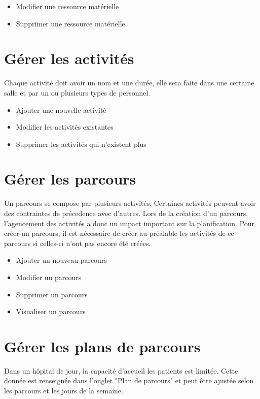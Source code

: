 \documentclass[noposter]{polytech/polytech}
\begin{document}
\begin{itemize}
	\item Modifier une ressource matérielle
	\item Supprimer une ressource matérielle 
\end{itemize}


\section{Gérer les activités}

Chaque activité doit avoir un nom et une durée, elle sera faite dans une certaine salle et par un ou plusieurs types de personnel.

\begin{itemize}
	\item Ajouter une nouvelle activité
	\item Modifier les activités existantes
	\item Supprimer les activités qui n'existent plus
\end{itemize}


\section{Gérer les parcours}

Un parcours se compose par plusieurs activités. Certaines activités peuvent avoir des contraintes de précedence avec d'autres. Lors de la création d'un parcours, l'agencement des activités a donc un impact important sur la planification. Pour créer un parcours, il est nécessaire de créer au préalable les activités de ce parcours si celles-ci n'ont pas encore été créées.

\begin{itemize}
	\item Ajouter un nouveau parcours
	\item Modifier un parcours
	\item Supprimer un parcours
	\item Visualiser un parcours
\end{itemize}

\section{Gérer les plans de parcours}

Dans un hôpital de jour, la capacité d'accueil les patients est limitée. Cette donnée est renseignée dans l'onglet "Plan de parcours" et peut être ajustée selon les parcours et les jours de la semaine. 
\end{document}
